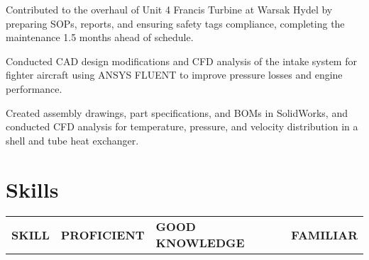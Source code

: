 \documentclass[]{hussain-resume-openfont}
\begin{document}
\begin{minipage}[t]{0.63\textwidth}
\begin{tightemize}
    \justifying
    \item Contributed to the overhaul of Unit 4 Francis Turbine at Warsak Hydel by preparing SOPs, reports, and ensuring safety tags compliance, completing the maintenance 1.5 months ahead of schedule.
\end{tightemize}
\sectionsep

\begin{tightemize}
    \justifying
    \item Conducted CAD design modifications and CFD analysis of the intake system for fighter aircraft using ANSYS FLUENT to improve pressure losses and engine performance.
\end{tightemize}
\sectionsep

\begin{tightemize}
    \justifying
    \item Created assembly drawings, part specifications, and BOMs in SolidWorks, and conducted CFD analysis for temperature, pressure, and velocity distribution in a shell and tube heat exchanger.
\end{tightemize}
\sectionsep


\section{Skills}
\begin{tabular}{rlll}
\textbf{SKILL} & \textbf{PROFICIENT} & \textbf{GOOD KNOWLEDGE}   & \textbf{FAMILIAR}  \\


\end{tabular}
\end{minipage}
\end{document}
